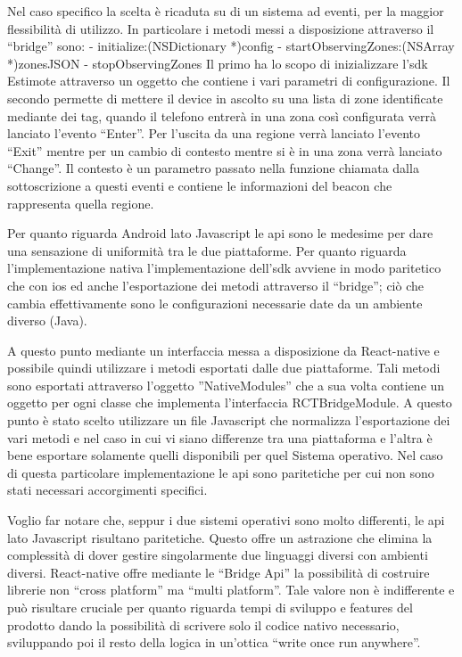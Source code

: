Nel caso specifico la scelta è ricaduta su di un sistema ad eventi, per la maggior flessibilità di utilizzo. In particolare i metodi messi a disposizione attraverso il “bridge” sono:
	- initialize:(NSDictionary *)config
	- startObservingZones:(NSArray *)zonesJSON
	- stopObservingZones
	\vspace{5mm}
Il primo ha lo scopo di inizializzare l’sdk Estimote attraverso un oggetto che contiene i vari parametri di configurazione. Il secondo permette di mettere il device in ascolto su una lista di zone identificate mediante dei tag, quando il telefono entrerà in una zona così configurata verrà lanciato l’evento “Enter”. Per l’uscita da una regione verrà lanciato l’evento “Exit” mentre per un cambio di contesto mentre si è in una zona verrà lanciato “Change”. Il contesto è un parametro passato nella funzione chiamata dalla sottoscrizione a questi eventi e contiene le informazioni del beacon che rappresenta quella regione.\vspace{5mm}

Per quanto riguarda Android lato Javascript le api sono le medesime per dare una sensazione di uniformità tra le due piattaforme. Per quanto riguarda l’implementazione nativa l’implementazione dell’sdk avviene in modo paritetico che con ios ed anche l’esportazione dei metodi attraverso il “bridge”; ciò che cambia effettivamente sono le configurazioni necessarie date da un ambiente diverso (Java).\vspace{5mm}

A questo punto mediante un interfaccia messa a disposizione da React-native e possibile quindi utilizzare i metodi esportati dalle due piattaforme. Tali metodi sono esportati attraverso l’oggetto ”NativeModules” che a sua volta contiene un oggetto per ogni classe che implementa l’interfaccia RCTBridgeModule. A questo punto è stato scelto utilizzare un file Javascript che normalizza l’esportazione dei vari metodi e nel caso in cui vi siano differenze tra una piattaforma e l’altra è bene esportare solamente quelli disponibili per quel Sistema operativo. Nel caso di questa particolare implementazione le api sono paritetiche per cui non sono stati necessari accorgimenti specifici.\vspace{5mm}

Voglio far notare che, seppur i due sistemi operativi sono molto differenti, le api lato Javascript risultano paritetiche. Questo offre un astrazione che elimina la complessità di dover gestire singolarmente due linguaggi diversi con ambienti diversi. React-native offre mediante le “Bridge Api” la possibilità di costruire librerie non “cross platform” ma “multi platform”. Tale valore non è indifferente e può risultare cruciale per quanto riguarda tempi di sviluppo e features del prodotto dando la possibilità di scrivere solo il codice nativo necessario, sviluppando poi il resto della logica in un'ottica “write once run anywhere”.\vspace{5mm}

